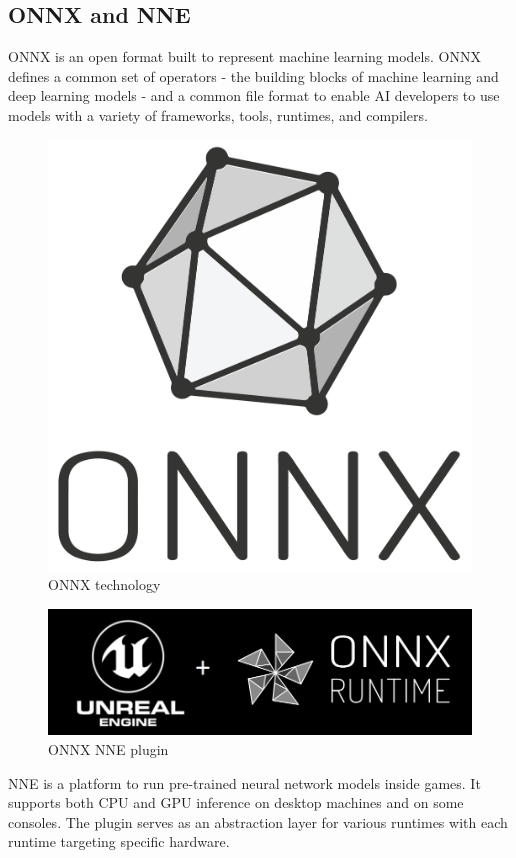 \documentclass[12pt]{book}
\begin{document}
\subsection{ONNX and NNE}
ONNX is an open format built to represent machine learning models. ONNX defines a common set of operators - the building blocks of machine learning and deep learning models - and a common file format to enable AI developers to use models with a variety of frameworks, tools, runtimes, and compilers.
\begin{figure}[!h]
    \centering
    \includegraphics[scale=0.3]{./Figures/onnx-stacked-color.png}
    \caption{ONNX technology}
    \label{ONNX technolofie}
\end{figure}
\begin{figure}[!h]
    \centering
    \includegraphics[scale=0.7]{./Figures/NNE.png}
    \caption{ONNX NNE plugin}
    \label{ONNX NNE plugin}
\end{figure}
NNE is a platform to run pre-trained neural network models inside games. It supports both CPU and GPU inference on desktop machines and on some consoles. The plugin serves as an abstraction layer for various runtimes with each runtime targeting specific hardware.
\end{document}
